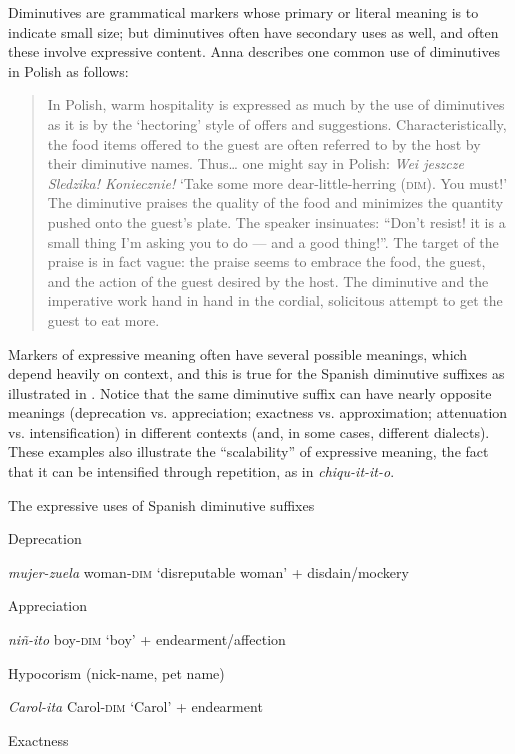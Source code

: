 Diminutives are grammatical markers whose primary or literal meaning is to indicate small size; but diminutives often have secondary uses as well, and often these involve expressive content. Anna \citet{Wierzbicka1985} describes one common use of diminutives in Polish as follows:


\begin{quote}
In Polish, warm hospitality is expressed as much by the use of diminutives as it is by the ‘hectoring’ style of offers and suggestions. Characteristically, the food items offered to the guest are often referred to by the host by their diminutive names. Thus… one might say in Polish: \textit{Wei jeszcze Sledzika! Koniecznie!} ‘Take some more dear-little-herring (\textsc{dim}). You must!’ The diminutive praises the quality of the food and minimizes the quantity pushed onto the guest’s plate. The speaker insinuates: “Don’t resist! it is a small thing I’m asking you to do — and a good thing!”. The target of the praise is in fact vague: the praise seems to embrace the food, the guest, and the action of the guest desired by the host. The diminutive and the imperative work hand in hand in the cordial, solicitous attempt to get the guest to eat more.
\end{quote}


Markers of expressive meaning often have several possible meanings, which depend heavily on context, and this is true for the Spanish diminutive suffixes as illustrated in . Notice that the same diminutive suffix can have nearly opposite meanings (deprecation vs. appreciation; exactness vs. approximation; attenuation vs. intensification) in different contexts (and, in some cases, different dialects). These examples also illustrate the “scalability” of expressive meaning, the fact that it can be intensified through repetition, as in \textit{chiqu-it-it-o}.


\ea \label{ex:2.21}
The expressive uses of Spanish diminutive suffixes \citep{Fortin2011}

\ea Deprecation

\textit{mujer-zuela}  woman\textsc{-dim}  ‘disreputable woman’ + disdain/mockery

 \ex Appreciation

\textit{niñ-ito}  boy-\textsc{dim}  ‘boy’ + endearment/affection

\ex  Hypocorism (nick-name, pet name)

\textit{Carol-ita}  Carol-\textsc{dim}  ‘Carol’ + endearment

\ex Exactness


